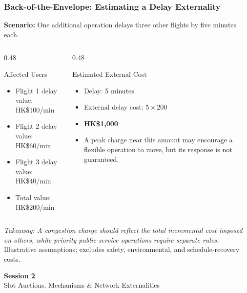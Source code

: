 \documentclass{beamer}
\begin{document}
\begin{frame}[t,shrink=11]
\frametitle{Back-of-the-Envelope: Estimating a Delay Externality}
\textbf{Scenario:} One additional operation delays three other flights by five minutes each.
\begin{columns}[T]
\begin{column}{0.48\textwidth}\begin{block}{Affected Users}
\begin{itemize}
\item Flight 1 delay value: HK\$100/min
\item Flight 2 delay value: HK\$60/min
\item Flight 3 delay value: HK\$40/min
\item Total value: HK\$200/min
\end{itemize}\end{block}\end{column}
\begin{column}{0.48\textwidth}\begin{block}{Estimated External Cost}
\begin{itemize}
\item Delay: 5 minutes
\item External delay cost: $5\times200$
\item \textbf{HK\$1,000}
\item A peak charge near this amount may encourage a flexible operation to move, but its response is not guaranteed.
\end{itemize}\end{block}\end{column}
\end{columns}
\textit{Takeaway: A congestion charge should reflect the total incremental cost imposed on others, while priority public-service operations require separate rules.}
\vfill{\tiny Illustrative assumptions; excludes safety, environmental, and schedule-recovery costs.}
\end{frame}

\begin{frame}[c]
  \begin{center}
    \huge\color{cuhkpurple}\textbf{Session 2}\\
    \vspace{0.5cm}
    \Large Slot Auctions, Mechanisms \& Network Externalities
  \end{center}
\end{frame}
\end{document}
